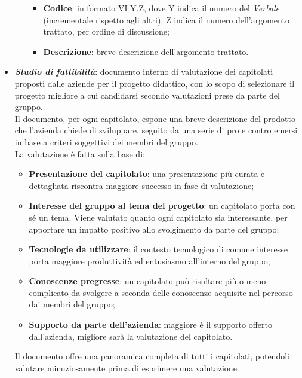 \begin{itemize}
\begin{itemize}
                        \begin{itemize}
                              \item \textbf{Codice}: in formato VI Y.Z, dove Y indica il numero del \textit{Verbale} (incrementale rispetto agli altri), Z indica il numero dell'argomento trattato, per ordine di discussione;
                              \item \textbf{Descrizione}: breve descrizione dell'argomento trattato.
                        \end{itemize}
            \end{itemize}
      \item \textit{\textbf{Studio di fattibilità}}: documento interno di valutazione dei capitolati proposti dalle aziende per il progetto didattico, con lo scopo di selezionare il progetto migliore a cui candidarsi secondo valutazioni
            prese da parte del gruppo.\\
            Il documento, per ogni capitolato, espone una breve descrizione del prodotto che l'azienda chiede di sviluppare, seguito da una serie di pro e contro emersi in base a criteri soggettivi dei membri del gruppo.
            \\La valutazione è fatta sulla base di:
            \begin{itemize}
                  \item \textbf{Presentazione del capitolato}: una presentazione più curata e dettagliata riscontra maggiore successo in fase di valutazione;
                  \item \textbf{Interesse del gruppo al tema del progetto}: un capitolato porta con sé un tema. Viene valutato quanto ogni capitolato sia interessante, per apportare un impatto positivo allo svolgimento da parte del gruppo;
                  \item \textbf{Tecnologie da utilizzare}: il contesto tecnologico di comune interesse porta maggiore produttività ed entusiasmo all'interno del gruppo;
                  \item \textbf{Conoscenze pregresse}: un capitolato può risultare più o meno complicato da svolgere a seconda delle conoscenze acquisite nel percorso dai membri del gruppo;
                  \item \textbf{Supporto da parte dell'azienda}: maggiore è il supporto offerto dall'azienda, migliore sarà la valutazione del capitolato.
            \end{itemize}
            Il documento offre una panoramica completa di tutti i capitolati, potendoli valutare minuziosamente prima di esprimere una valutazione.

\end{itemize}
